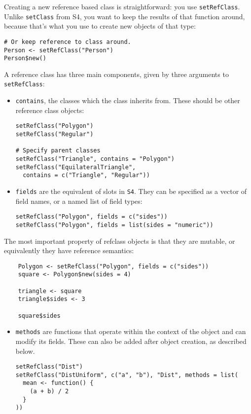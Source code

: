 Creating a new reference based class is straightforward: you use
\texttt{setRefClass}. Unlike \texttt{setClass} from S4, you want to keep
the results of that function around, because that's what you use to
create new objects of that type:

\begin{verbatim}
# Or keep reference to class around.
Person <- setRefClass("Person")
Person$new()
\end{verbatim}

A reference class has three main components, given by three arguments to
\texttt{setRefClass}:

\begin{itemize}
\item
  \texttt{contains}, the classes which the class inherits from. These
  should be other reference class objects:

\begin{verbatim}
setRefClass("Polygon")
setRefClass("Regular")

# Specify parent classes
setRefClass("Triangle", contains = "Polygon")
setRefClass("EquilateralTriangle", 
  contains = c("Triangle", "Regular"))
\end{verbatim}
\item
  \texttt{fields} are the equivalent of slots in \texttt{S4}. They can
  be specified as a vector of field names, or a named list of field
  types:

\begin{verbatim}
setRefClass("Polygon", fields = c("sides"))
setRefClass("Polygon", fields = list(sides = "numeric"))
\end{verbatim}
\end{itemize}

The most important property of refclass objects is that they are
mutable, or equivalently they have reference semantics:

\begin{verbatim}
    Polygon <- setRefClass("Polygon", fields = c("sides"))
    square <- Polygon$new(sides = 4)
    
    triangle <- square
    triangle$sides <- 3
    
    square$sides        
\end{verbatim}

\begin{itemize}
\item
  \texttt{methods} are functions that operate within the context of the
  object and can modify its fields. These can also be added after object
  creation, as described below.

\begin{verbatim}
setRefClass("Dist")
setRefClass("DistUniform", c("a", "b"), "Dist", methods = list(
  mean <- function() {
    (a + b) / 2
  }
))
\end{verbatim}
\end{itemize}


